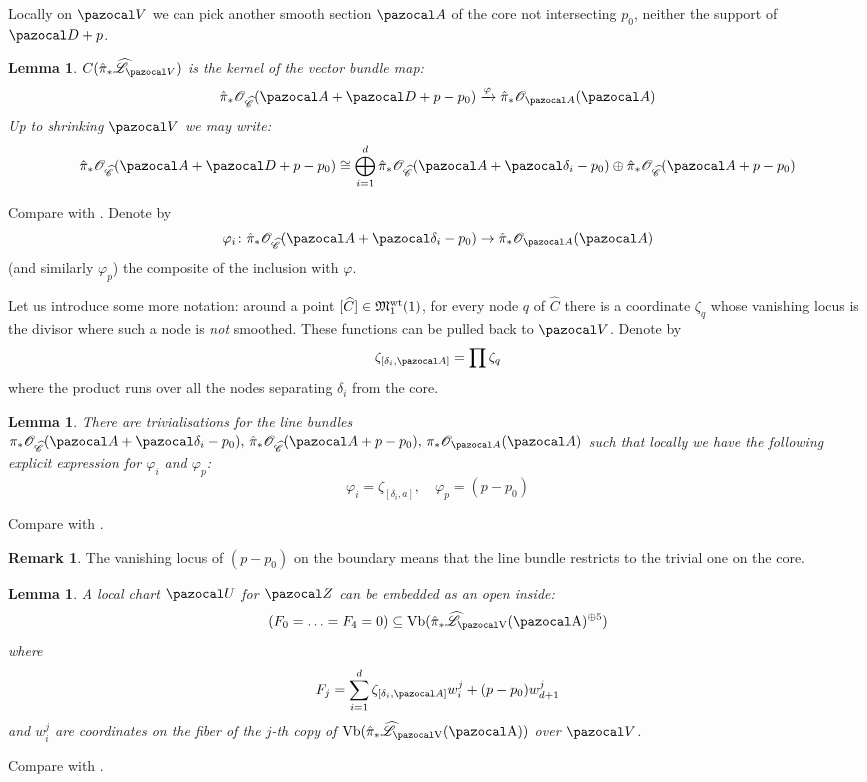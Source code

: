 \documentclass[11pt]{amsart}
\newcommand{\OO}{\mathcal O}
\renewcommand{\to}{\rightarrow}
\newcommand{\A}{\pazocal A}
\newcommand{\hL}{\widehat{\mathcal L}}
\newcommand{\hC}{\widehat{\mathcal C}}
\newcommand{\Z}{\pazocal Z}
\newcommand{\MM}{\mathfrak M}
\theoremstyle{plain}
\newtheorem{lem}[thm]{Lemma}
\theoremstyle{definition}
\newtheorem{remark}[thm]{Remark}
\begin{document}
Locally on $\pazocal V$ we can pick another smooth section $\A$ of the core not intersecting $p_0$, neither the support of $\pazocal D+p$.

\begin{lem}
$C(\hat\pi_*\hL_{\pazocal V})$ is the kernel of the vector bundle map:
\[ \hat\pi_*\OO_{\hC}(\A+\pazocal D+p-p_0)\xrightarrow{\varphi}\hat\pi_*\OO_{\A}(\A)\]
Up to shrinking $\pazocal V$ we may write:
\[\hat\pi_*\OO_{\hC}(\A+\pazocal D+p-p_0)\cong\bigoplus_{i=1}^d\hat\pi_*\OO_{\hC}(\A+\pazocal \delta_i-p_0)\oplus\hat\pi_*\OO_{\hC}(\A+p-p_0)\]
\end{lem}
Compare with \cite[Lemma 4.10]{HL}. Denote by \[\varphi_i\colon\hat\pi_*\OO_{\hC}(\A+\pazocal \delta_i-p_0)\to\hat\pi_*\OO_{\A}(\A)\] (and similarly $\varphi_p$) the composite of the inclusion with $\varphi$.

Let us introduce some more notation: around a point $[\widehat{C}]\in\MM_1^{\rm{wt}}(1)$, for every node $q$ of $\widehat{C}$ there is a coordinate $\zeta_q$ whose vanishing locus is the divisor where such a node is \emph{not} smoothed. These functions can be pulled back to $\pazocal V$. Denote by \[\zeta_{[\delta_i,\pazocal A]}=\prod\zeta_q\]
where the product runs over all the nodes separating $\delta_i$ from the core.
 
\begin{lem}
There are trivialisations for the line bundles $\pi_*\OO_{\hC}(\A+\pazocal \delta_i-p_0),\,\hat\pi_*\OO_{\hC}(\A+p-p_0),\, \pi_*\OO_{\A}(\A) $ such that locally we have the following explicit expression for $\varphi_i$ and $\varphi_p$:
\[\varphi_i=\zeta_{[\delta_i,a]}, \quad \varphi_p=(p-p_0)\]
\end{lem}
Compare with \cite[Proposition 4.13]{HL}.
\begin{remark}
The vanishing locus of $(p-p_0)$ on the boundary means that the line bundle restricts to the trivial one on the core.
\end{remark}

\begin{lem}\label{lem:equations}
A local chart $\pazocal U$ for $\Z$ can be embedded as an open inside:
\[ (F_0=\ldots=F_4=0)\subseteq \rm{Vb}(\hat{\pi}_*\hL_{\pazocal V}(\A)^{\oplus 5}) \]
where
\[ F_j=\sum_{i=1}^d \zeta_{[\delta_i,\pazocal A]}w_i^j+(p-p_0)w_{d+1}^j \]
and $w_i^j$ are coordinates on the fiber of the $j$-th copy of $\rm{Vb}(\hat{\pi}_*\hL_{\pazocal V}(\A))$ over $\pazocal V$.
\end{lem}
Compare with \cite[Theorems 2.17-19]{HL}.
\end{document}
